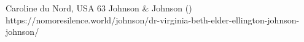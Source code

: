           {Caroline du Nord, USA}
          {63}
          {Johnson \& Johnson}
          {}
          { ()}
          {https://nomoresilence.world/johnson/dr-virginia-beth-elder-ellington-johnson-johnson/}
